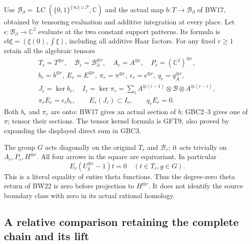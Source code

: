 Use $\mathcal B_{\partial}=\operatorname{LC}
(\{0,1\}^{\{\infty\}\sqcup\mathcal P},\mathbb C)$ and the
actual map $b:T\to\mathcal B_{\partial}$ of BW17, obtained
by tensoring evaluation and additive integration at every place.
Let $\epsilon:\mathcal B_{\partial}\to\mathbb C^2$ evaluate
at the two constant support patterns. Its formula is
$\epsilon b\xi=(\xi(0),\int\xi)$, including all additive
Haar factors. For any fixed $r\ge1$ retain all the algebraic tensors
\begin{equation}\tag{GBC5}
 \begin{gathered}
 T_r=T^{\otimes r},\quad \mathcal B_r=\mathcal B_{\partial}^{\otimes r},
 \quad A_r=A^{\otimes r},\quad P_r=(\mathbb C^2)^{\otimes r},\\
 b_r=b^{\otimes r},\ E_r=E^{\otimes r},\
 \pi_r=\pi^{\otimes r},\ \epsilon_r=\epsilon^{\otimes r},\
 q_r=q_A^{\otimes r},\\
 J_r=\ker b_r,\quad I_r=\ker\pi_r
     =\sum_i A^{\otimes(i-1)}\otimes\mathscr B
                          \otimes A^{\otimes(r-i)},\\
 \pi_r E_r=\epsilon_r b_r,\qquad
 E_r(J_r)\subset I_r,\qquad q_rE_r=0.
 \end{gathered}
\end{equation}
Both $b_r$ and $\pi_r$ are onto: BW17 gives an actual section
of $b$; GBC2--3 gives one of $\pi$; tensor their sections.
The tensor kernel formula is GFT9, also proved by expanding
the displayed direct sum in GBC3.

The group $G$ acts diagonally on the original $T_r$ and
$\mathcal B_r$; it acts trivially on $A_r,P_r,H^{\otimes r}$.
All four arrows in the square are equivariant. In particular
\begin{equation}\tag{GBC6}
 E_r(U_g^{\otimes r}-1)t=0\quad(t\in T_r,g\in G).
\end{equation}
This is a literal equality of entire theta functions. Thus the
degree-zero theta return of BW22 is zero before projection to
$H^{\otimes r}$. It does not identify the source boundary class
with zero in its actual rational homology.

\subsection{A relative comparison retaining the complete chain and its lift}

